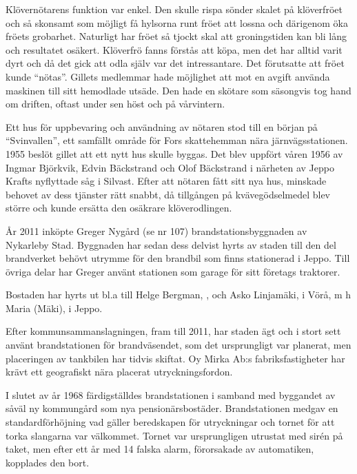 Klövernötarens funktion var enkel. Den skulle rispa sönder skalet på klöverfröet och så skonsamt som möjligt få hylsorna runt fröet att lossna och därigenom öka fröets grobarhet. Naturligt har fröet så tjockt skal att groningstiden kan bli lång och resultatet osäkert. Klöverfrö fanns förstås att köpa, men det har alltid varit dyrt och då det gick att odla själv var det intressantare. Det förutsatte att fröet kunde ``nötas''. Gillets medlemmar hade möjlighet att mot en avgift använda maskinen till sitt hemodlade utsäde. Den hade en skötare som säsongvis tog hand om driften, oftast under sen höst och på vårvintern.

Ett hus för uppbevaring och användning av nötaren stod till en början på ``Svinvallen'', ett samfällt område för Fors skattehemman nära järnvägsstationen. 1955 beslöt gillet att ett nytt hus skulle byggas. Det blev uppfört våren 1956 av Ingmar Björkvik, Edvin  Bäckstrand och Olof Bäckstrand i närheten av Jeppo Krafts nyflyttade såg i Silvast. Efter att nötaren fått sitt nya hus, minskade behovet av dess tjänster rätt snabbt, då tillgången på kvävegödselmedel blev större och kunde ersätta den osäkrare klöverodlingen.



%



%
År 2011 inköpte Greger Nygård (se nr 107) brandstationsbyggnaden av Nykarleby Stad. Byggnaden har sedan dess delvist hyrts av staden till den del brandverket behövt utrymme för den brandbil som finns stationerad i Jeppo. Till övriga delar har Greger använt stationen som garage för sitt företags traktorer.

Bostaden har hyrts ut bl.a till Helge Bergman, , och Asko Linjamäki,  i Vörå, m h Maria (Mäki),  i Jeppo.


%
Efter kommunsammanslagningen, fram till 2011, har staden ägt och i stort sett använt brandstationen för brandväsendet, som det ursprungligt var planerat, men placeringen av tankbilen har tidvis skiftat. Oy Mirka Ab:s fabriksfastigheter har krävt ett geografiskt nära placerat utryckningsfordon.


%
I slutet av år 1968 färdigställdes brandstationen i samband med byggandet av såväl ny kommungård som nya pensionärsbostäder. Brandstationen medgav en standardförhöjning vad gäller beredskapen för utryckningar och tornet för att torka slangarna var välkommet. Tornet var ursprungligen utrustat med sirén på taket, men efter ett år med 14 falska alarm, förorsakade av automatiken, kopplades den bort.

